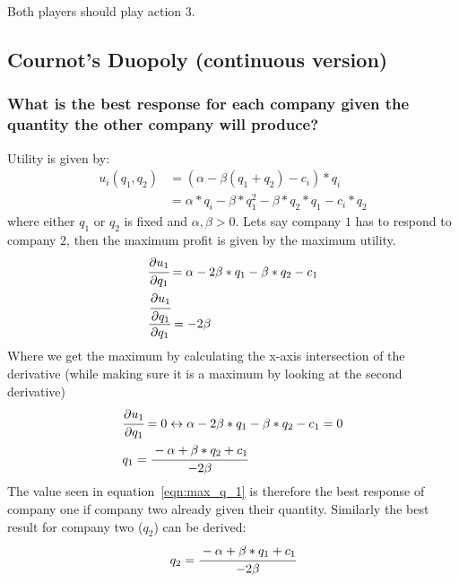 \documentclass[11pt]{article}
\begin{document}
    Both players should play action 3.

    \subsection{Cournot’s Duopoly (continuous version)}

    \subsubsection{What is the best response for each company given the quantity the other company will produce?}
    Utility is given by:
    \begin{equation}
        \begin{split}
            u_i(q_1,q_2)&=(\alpha -\beta(q_1+q_2) - c_i)*q_i\\
            &=\alpha*q_i -\beta*q_1^2 -\beta*q_2*q_1 - c_i*q_2
        \end{split}
    \end{equation}
    where either $q_1$ or $q_2$ is fixed and $\alpha, \beta>0$.
    Lets say company $1$ has to respond to company $2$, then the maximum profit is given by the maximum utility.
    \begin{align}
        & \cfrac{\partial u_1}{\partial q_1}=\alpha - 2\beta*q_1 - \beta*q_2 - c_1\\
        & \cfrac{\cfrac{\partial u_1}{\partial q_1}}{\partial q_1}=-2\beta
    \end{align}
    Where we get the maximum by calculating the x-axis intersection of the derivative (while making sure it is a maximum by
    looking at the second derivative)
    \begin{align}
        &\cfrac{\partial u_1}{\partial q_1}=0 \leftrightarrow \alpha - 2\beta*q_1 - \beta*q_2 - c_1=0\\
        & q_1 = \cfrac{-\alpha+\beta*q_2 + c_1}{-2\beta}
        \label{eqn:max_q_1}
    \end{align}
    The value seen in equation~\ref{eqn:max_q_1} is therefore the best response of company one if company two already
    given their quantity. Similarly the best result for company two ($q_2$) can be derived:
    \begin{equation*}
        q_2 = \cfrac{-\alpha+\beta*q_1 + c_1}{-2\beta}
    \end{equation*}
\end{document}
